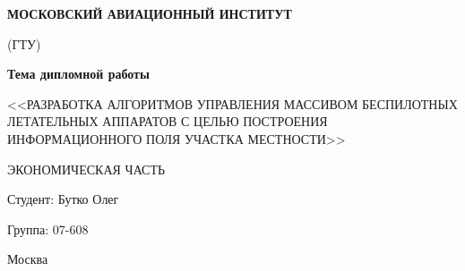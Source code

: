 \begin{titlepage}
\newpage

\begin{center}

    \textbf{МОСКОВСКИЙ АВИАЦИОННЫЙ ИНСТИТУТ}

    (ГТУ)

\end{center}

\vspace{\fill}

\begin{center}

    \textbf{Тема дипломной работы}

    <<РАЗРАБОТКА АЛГОРИТМОВ УПРАВЛЕНИЯ МАССИВОМ БЕСПИЛОТНЫХ
    ЛЕТАТЕЛЬНЫХ АППАРАТОВ С ЦЕЛЬЮ ПОСТРОЕНИЯ ИНФОРМАЦИОННОГО
    ПОЛЯ УЧАСТКА МЕСТНОСТИ>>

    \vspace{0.5em}

    ЭКОНОМИЧЕСКАЯ ЧАСТЬ

\end{center}

\vspace{\fill}

\begin{flushright}
    Студент: Бутко Олег

    Группа: 07-608

\end{flushright}

\vspace{\fill}

\begin{center}
    Москва
\end{center}

\end{titlepage}
